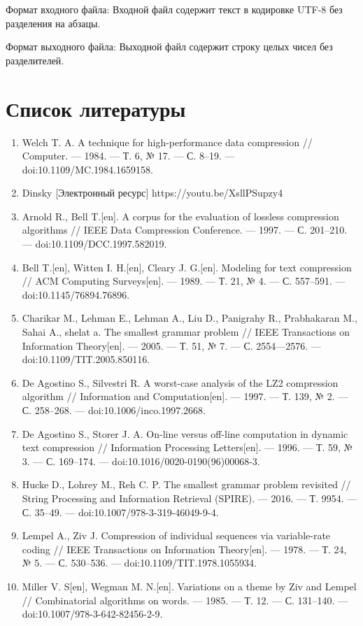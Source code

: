 \documentclass{article}
\begin{document}
Формат входного файла:
Входной файл содержит текст в кодировке UTF-8 без разделения на абзацы.

Формат выходного файла:
Выходной файл содержит строку целых чисел без разделителей.

\section{Список литературы}

\begin{enumerate}
\item Welch T. A. A technique for high-performance data compression // Computer. — 1984. — Т. 6, № 17. — С. 8–19. — doi:10.1109/MC.1984.1659158.
\item Dinsky [Электронный ресурс] https://youtu.be/XsllPSupzy4
\item Arnold R., Bell T.[en]. A corpus for the evaluation of lossless compression algorithms // IEEE Data Compression Conference. — 1997. — С. 201–210. — doi:10.1109/DCC.1997.582019.
\item Bell T.[en], Witten I. H.[en], Cleary J. G.[en]. Modeling for text compression // ACM Computing Surveys[en]. — 1989. — Т. 21, № 4. — С. 557–591. — doi:10.1145/76894.76896.
\item Charikar M., Lehman E., Lehman A., Liu D., Panigrahy R., Prabhakaran M., Sahai A., shelat a. The smallest grammar problem // IEEE Transactions on Information Theory[en]. — 2005. — Т. 51, № 7. — С. 2554—2576. — doi:10.1109/TIT.2005.850116.
\item De Agostino S., Silvestri R. A worst-case analysis of the LZ2 compression algorithm // Information and Computation[en]. — 1997. — Т. 139, № 2. — С. 258–268. — doi:10.1006/inco.1997.2668.
\item De Agostino S., Storer J. A. On-line versus off-line computation in dynamic text compression // Information Processing Letters[en]. — 1996. — Т. 59, № 3. — С. 169–174. — doi:10.1016/0020-0190(96)00068-3.
\item Hucke D., Lohrey M., Reh C. P. The smallest grammar problem revisited // String Processing and Information Retrieval (SPIRE). — 2016. — Т. 9954. — С. 35–49. — doi:10.1007/978-3-319-46049-9-4.
\item Lempel A., Ziv J. Compression of individual sequences via variable-rate coding // IEEE Transactions on Information Theory[en]. — 1978. — Т. 24, № 5. — С. 530–536. — doi:10.1109/TIT.1978.1055934.
\item Miller V. S[en], Wegman M. N.[en]. Variations on a theme by Ziv and Lempel // Combinatorial algorithms on words. — 1985. — Т. 12. — С. 131–140. — doi:10.1007/978-3-642-82456-2-9.

\end{enumerate}
\end{document}
